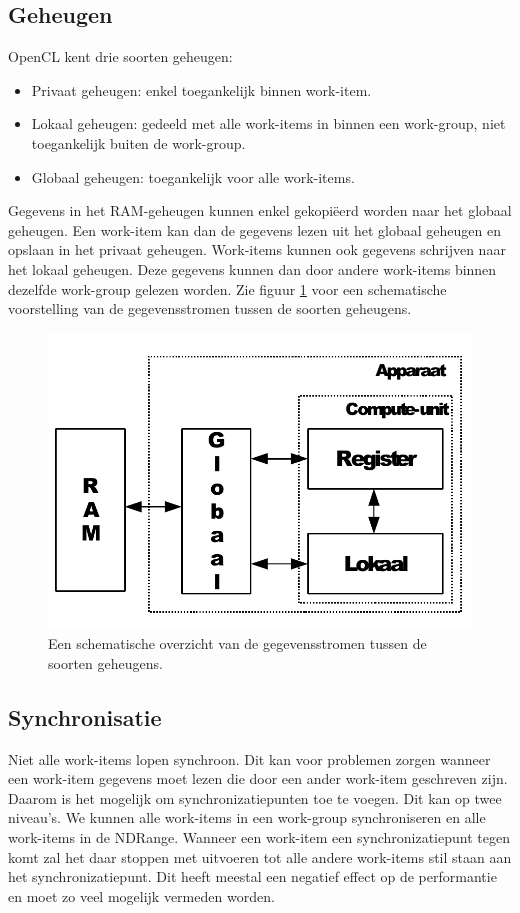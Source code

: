 \subsection{Geheugen}
\label{h:opencl:geheugen}
OpenCL kent drie soorten geheugen:
\begin{itemize}
    \item Privaat geheugen: enkel toegankelijk binnen work-item.
    \item Lokaal geheugen: gedeeld met alle work-items in binnen een work-group, niet toegankelijk buiten de work-group.
    \item Globaal geheugen: toegankelijk voor alle work-items.
\end{itemize}

Gegevens in het RAM-geheugen kunnen enkel gekopi\"eerd worden naar het globaal geheugen. Een work-item kan dan de gegevens lezen uit het globaal geheugen en opslaan in het privaat geheugen. Work-items kunnen ook gegevens schrijven naar het lokaal geheugen. Deze gegevens kunnen dan door andere work-items binnen dezelfde work-group gelezen worden. Zie figuur \ref{geheugenCL} voor een schematische voorstelling van de gegevensstromen tussen de soorten geheugens.

\begin{figure}[]
\centering
\includegraphics[scale=0.5]{geheugenCL}
\caption{\label{geheugenCL}Een schematische overzicht van de gegevensstromen tussen de soorten geheugens.}
\end{figure}

\subsection{Synchronisatie}
Niet alle work-items lopen synchroon. Dit kan voor problemen zorgen wanneer een work-item gegevens moet lezen die door een ander work-item geschreven zijn. Daarom is het mogelijk om synchronizatiepunten toe te voegen. Dit kan op twee niveau's. We kunnen alle work-items in een work-group synchroniseren en alle work-items in de NDRange. Wanneer een work-item een synchronizatiepunt tegen komt zal het daar stoppen met uitvoeren tot alle andere work-items stil staan aan het synchronizatiepunt. Dit heeft meestal een negatief effect op de performantie en moet zo veel mogelijk vermeden worden.

